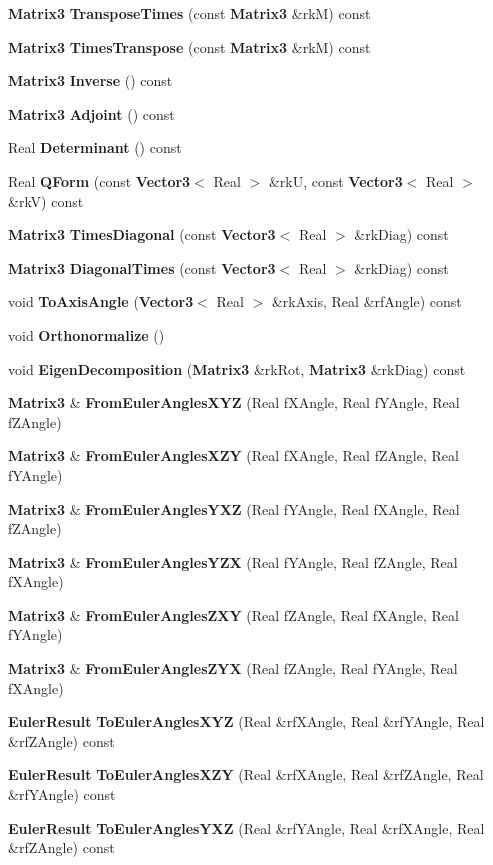 \begin{CompactItemize}
{\bf Matrix3} {\bf Transpose\-Times} (const {\bf Matrix3} \&rk\-M) const
\item 
{\bf Matrix3} {\bf Times\-Transpose} (const {\bf Matrix3} \&rk\-M) const
\item 
{\bf Matrix3} {\bf Inverse} () const
\item 
{\bf Matrix3} {\bf Adjoint} () const
\item 
Real {\bf Determinant} () const
\item 
Real {\bf QForm} (const {\bf Vector3}$<$ Real $>$ \&rk\-U, const {\bf Vector3}$<$ Real $>$ \&rk\-V) const
\item 
{\bf Matrix3} {\bf Times\-Diagonal} (const {\bf Vector3}$<$ Real $>$ \&rk\-Diag) const
\item 
{\bf Matrix3} {\bf Diagonal\-Times} (const {\bf Vector3}$<$ Real $>$ \&rk\-Diag) const
\item 
void {\bf To\-Axis\-Angle} ({\bf Vector3}$<$ Real $>$ \&rk\-Axis, Real \&rf\-Angle) const
\item 
void {\bf Orthonormalize} ()
\item 
void {\bf Eigen\-Decomposition} ({\bf Matrix3} \&rk\-Rot, {\bf Matrix3} \&rk\-Diag) const
\item 
{\bf Matrix3} \& {\bf From\-Euler\-Angles\-XYZ} (Real f\-XAngle, Real f\-YAngle, Real f\-ZAngle)
\item 
{\bf Matrix3} \& {\bf From\-Euler\-Angles\-XZY} (Real f\-XAngle, Real f\-ZAngle, Real f\-YAngle)
\item 
{\bf Matrix3} \& {\bf From\-Euler\-Angles\-YXZ} (Real f\-YAngle, Real f\-XAngle, Real f\-ZAngle)
\item 
{\bf Matrix3} \& {\bf From\-Euler\-Angles\-YZX} (Real f\-YAngle, Real f\-ZAngle, Real f\-XAngle)
\item 
{\bf Matrix3} \& {\bf From\-Euler\-Angles\-ZXY} (Real f\-ZAngle, Real f\-XAngle, Real f\-YAngle)
\item 
{\bf Matrix3} \& {\bf From\-Euler\-Angles\-ZYX} (Real f\-ZAngle, Real f\-YAngle, Real f\-XAngle)
\item 
{\bf Euler\-Result} {\bf To\-Euler\-Angles\-XYZ} (Real \&rf\-XAngle, Real \&rf\-YAngle, Real \&rf\-ZAngle) const
\item 
{\bf Euler\-Result} {\bf To\-Euler\-Angles\-XZY} (Real \&rf\-XAngle, Real \&rf\-ZAngle, Real \&rf\-YAngle) const
\item 
{\bf Euler\-Result} {\bf To\-Euler\-Angles\-YXZ} (Real \&rf\-YAngle, Real \&rf\-XAngle, Real \&rf\-ZAngle) const
\item 

\end{CompactItemize}
